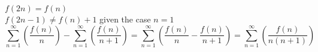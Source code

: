 \documentclass{article}
\begin{document}
$f(2n) = f(n)$\\
$f(2n - 1) \neq f(n)+1$ given the case $n = 1$\\
$$\sum_{n=1}^\infty \left( \frac{f(n)}{n} \right) - \sum_{n=1}^\infty \left( \frac{f(n)}{n+1} \right) = \sum_{n=1}^\infty \left( \frac{f(n)}{n} - \frac{f(n)}{n+1} \right) = \sum_{n=1}^\infty \left( \frac{f(n)}{n(n+1)} \right) $$\\
\end{document}
